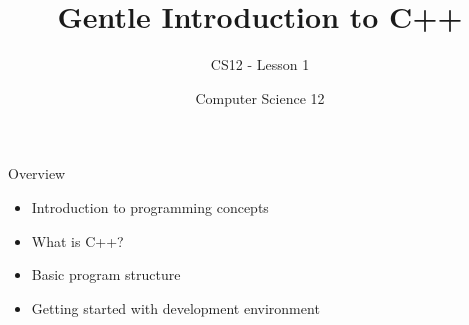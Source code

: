 \documentclass[10pt]{beamer}
\title{Gentle Introduction to C++}
\subtitle{CS12 - Lesson 1}
\author{Computer Science 12}
\date{}
\begin{document}
\begin{frame}
    \titlepage
\end{frame}

\begin{frame}{Overview}
    \begin{itemize}
        \item Introduction to programming concepts
        \item What is C++?
        \item Basic program structure
        \item Getting started with development environment
    \end{itemize}
\end{frame}

\end{document}
